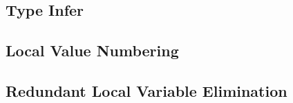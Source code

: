 




\subsection{Type Infer}

\subsection{Local Value Numbering}

\subsection{Redundant Local Variable Elimination}